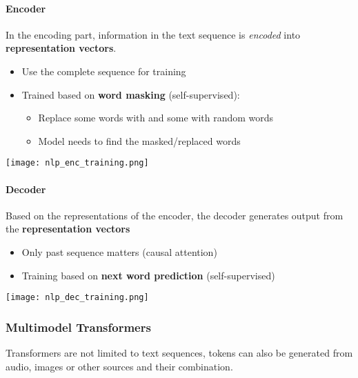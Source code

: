 \paragraph{Encoder}
In the encoding part, information in the text sequence is \textit{encoded} into \textbf{representation vectors}.
\newpar{}
\begin{itemize}
    \item Use the complete sequence for training
    \item Trained based on \textbf{word masking} (self-supervised):
          \begin{itemize}
              \item Replace some words with  and some with random words
              \item Model needs to find the masked/replaced words
          \end{itemize}
\end{itemize}
\begin{center}
    \texttt{[image: nlp\_enc\_training.png]}
\end{center}


\paragraph{Decoder}

Based on the representations of the encoder, the decoder generates output from the \textbf{representation vectors}
\newpar{}
\begin{itemize}
    \item Only past sequence matters (causal attention)
    \item Training based on \textbf{next word prediction} (self-supervised)
\end{itemize}
\begin{center}
    \texttt{[image: nlp\_dec\_training.png]}
\end{center}

\subsubsection{Multimodel Transformers}
Transformers are not limited to text sequences, tokens can also be generated from audio, images or other sources and their combination.
